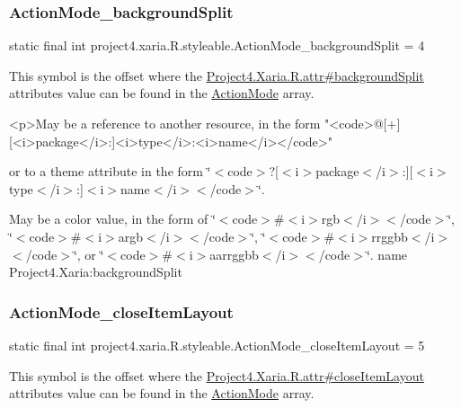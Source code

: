 \subsubsection{\texorpdfstring{Action\+Mode\+\_\+background\+Split}{ActionMode\_backgroundSplit}}
{\footnotesize\ttfamily static final int project4.\+xaria.\+R.\+styleable.\+Action\+Mode\+\_\+background\+Split = 4\hspace{0.3cm}{\ttfamily [static]}}

This symbol is the offset where the \hyperlink{}{Project4.\+Xaria.\+R.\+attr\#background\+Split} attribute\textquotesingle{}s value can be found in the \hyperlink{classproject4_1_1xaria_1_1R_1_1styleable_af9c7aa13148c68a1e3b75f513d014daa}{Action\+Mode} array.

\begin{DoxyVerb}      <p>May be a reference to another resource, in the form "<code>@[+][<i>package</i>:]<i>type</i>:<i>name</i></code>"
\end{DoxyVerb}
 or to a theme attribute in the form \char`\"{}$<$code$>$?\mbox{[}$<$i$>$package$<$/i$>$\+:\mbox{]}\mbox{[}$<$i$>$type$<$/i$>$\+:\mbox{]}$<$i$>$name$<$/i$>$$<$/code$>$\char`\"{}. 

May be a color value, in the form of \char`\"{}$<$code$>$\#$<$i$>$rgb$<$/i$>$$<$/code$>$\char`\"{}, \char`\"{}$<$code$>$\#$<$i$>$argb$<$/i$>$$<$/code$>$\char`\"{}, \char`\"{}$<$code$>$\#$<$i$>$rrggbb$<$/i$>$$<$/code$>$\char`\"{}, or \char`\"{}$<$code$>$\#$<$i$>$aarrggbb$<$/i$>$$<$/code$>$\char`\"{}.  name Project4.\+Xaria\+:background\+Split \mbox{\label{classproject4_1_1xaria_1_1R_1_1styleable_a63d571b40c30f57b55825bd03e4d00dc}} 
\subsubsection{\texorpdfstring{Action\+Mode\+\_\+close\+Item\+Layout}{ActionMode\_closeItemLayout}}
{\footnotesize\ttfamily static final int project4.\+xaria.\+R.\+styleable.\+Action\+Mode\+\_\+close\+Item\+Layout = 5\hspace{0.3cm}{\ttfamily [static]}}

This symbol is the offset where the \hyperlink{}{Project4.\+Xaria.\+R.\+attr\#close\+Item\+Layout} attribute\textquotesingle{}s value can be found in the \hyperlink{classproject4_1_1xaria_1_1R_1_1styleable_af9c7aa13148c68a1e3b75f513d014daa}{Action\+Mode} array.

